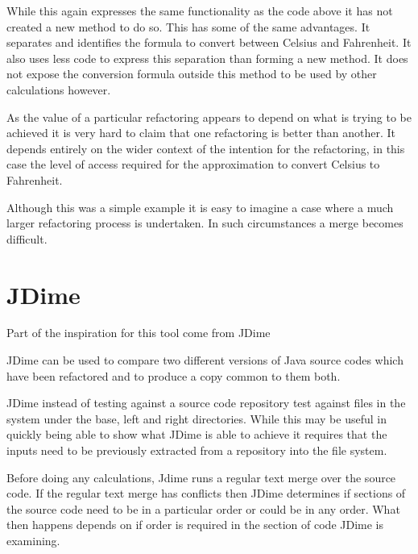 While this again expresses the same functionality as the code above it has not created a new method to do so. This has some of the same advantages. It separates and identifies the formula to convert between Celsius and Fahrenheit. It also uses less code to express this separation than forming a new method. It does not expose the conversion formula outside this method to be used by other calculations however.

As the value of a particular refactoring appears to depend on what is trying to be achieved it is very hard to claim that one refactoring is better than another. It depends entirely on the wider context of the intention for the refactoring, in this case the level of access required for the approximation to convert Celsius to Fahrenheit.

Although this was a simple example it is easy to imagine a case where a much larger refactoring process is undertaken. In such circumstances a merge becomes difficult. 

\section{JDime}
Part of the inspiration for this tool come from JDime

JDime can be used to compare two different versions of Java source codes which have been refactored and to produce a copy common to them both. 

JDime instead of testing against a source code repository test against files in the system under the base, left and right directories.
While this may be useful in quickly being able to show what JDime is able to achieve it requires that the inputs need to be previously extracted from a repository into the file system.

Before doing any calculations, Jdime runs a regular text merge over the source code.  
If the regular text merge has conflicts then JDime determines if sections of the source code need to be in a particular order or could be in any order.
What then happens depends on if order is required in the section of code JDime is examining.

